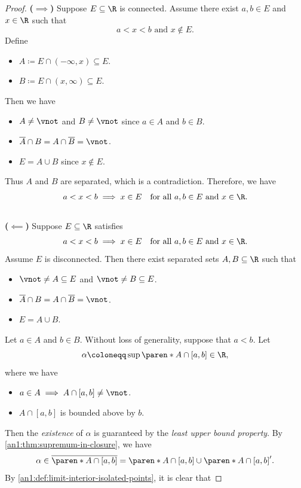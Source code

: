 \begin{proof}
  \textbf{($\implies$)} Suppose $E \subseteq \R$ is connected. Assume there exist $a, b \in E$ and $x \in \R$ such that
  \[
    a < x < b \text{ and } x \notin E.
  \]
  Define
  \begin{itemize}
    \item $A \coloneqq E \cap (-\infty, x) \subseteq E$.
    \item $B \coloneqq E \cap (x, \infty) \subseteq E$.
  \end{itemize}
  Then we have
  \begin{itemize}
    \item $A \neq \vnot$ and $B \neq \vnot$ since $a \in A$ and $b \in B$.
    \item $\overline{A} \cap B = A \cap \overline{B} = \vnot$.
    \item $E = A \cup B$ since $x \notin E$.
  \end{itemize}
  Thus $A$ and $B$ are separated, which is a contradiction. Therefore, we have
  \[
    a < x < b \implies x \in E \quad \text{for all } a, b \in E \text{ and } x \in \R.
  \]
  \\[6mm]
  \textbf{($\impliedby$)} Suppose $E \subseteq \R$ satisfies
  \[
    a < x < b \implies x \in E \quad \text{for all } a, b \in E \text{ and } x \in \R.
  \]
  Assume $E$ is disconnected. Then there exist separated sets $A, B \subseteq \R$ such that
  \begin{itemize}
    \item $\vnot \neq A \subseteq E$ and $\vnot \neq B \subseteq E$.
    \item $\overline{A} \cap B = A \cap \overline{B} = \vnot$.
    \item $E = A \cup B$.
  \end{itemize}
  Let $a \in A$ and $b \in B$. Without loss of generality, suppose that $a < b$. Let
  \[
    \alpha \coloneqq \sup\paren*{A \cap [a, b]} \in \R,
  \]
  where we have
  \begin{itemize}
    \item $a \in A \implies A \cap [a, b] \neq \vnot$.
    \item $A \cap [a, b]$ is bounded above by $b$.
  \end{itemize}
  Then the \emph{existence} of $\alpha$ is guaranteed by the \emph{least upper bound property}.
  By \cref{an1:thm:supremum-in-closure}, we have
  \[
    \alpha \in \overline{\paren*{A \cap [a, b]}} = \paren*{A \cap [a, b]} \cup \paren*{A \cap [a, b]}'.
  \]
  By \cref{an1:def:limit-interior-isolated-points}, it is clear that

\end{proof}

